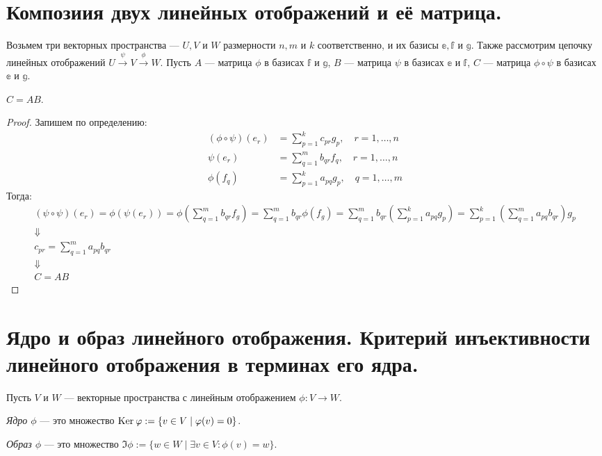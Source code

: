 \section{Композиия двух линейных отображений и её матрица.}

Возьмем три векторных пространства --- $U, V$ и $W$ размерности $n, m$ и $k$ соответственно, и их базисы $\mathbb{e}, \mathbb{f}$ и $\mathbb{g}$. Также рассмотрим цепочку линейных отображений $U \xrightarrow{\psi} V \xrightarrow{\phi} W$. Пусть $A$ --- матрица $\phi$ в базисах $\mathbb{f}$ и $\mathbb{g}$, $B$ --- матрица $\psi$ в базисах $\mathbb{e}$ и $\mathbb{f}$, $C$ --- матрица $\phi\circ\psi$ в базисах $\mathbb{e}$ и $\mathbb{g}$.

\begin{Suggestion}
$C = AB$.
\end{Suggestion}
\begin{proof} Запишем по определению:
\begin{align*}
(\phi \circ \psi)(e_r) &= \sum_{p = 1}^{k}c_{pr}g_p, \quad r = 1, \ldots, n \\
\psi(e_r) &= \sum_{q = 1}^{m}b_{qr}f_q, \quad r = 1, \ldots, n \\
\phi(f_q) &= \sum_{p = 1}^{k}a_{pq}g_p, \quad q = 1, \ldots, m
\end{align*}
Тогда:
\begin{gather*}
(\psi\circ\psi)(e_r) = \phi(\psi(e_r)) = \phi\left(\sum_{q = 1}^{m}b_{qr}f_g \right) = \sum_{q = 1}^{m}b_{qr}\phi(f_g) = \sum_{q = 1}^{m}b_{qr}\left(\sum_{p = 1}^{k}a_{pq}g_p \right) = \sum_{p = 1}^{k}\left(\sum_{q = 1}^{m}a_{pq}b_{qr} \right)g_p \\
\Downarrow \\
c_{pr} = \sum_{q = 1}^{m}a_{pq}b_{qr} \\
\Downarrow\\
 C = AB
\end{gather*}
\end{proof}

\section{Ядро и образ линейного отображения. Критерий инъективности линейного отображения в терминах его ядра.}

Пусть $V$ и $W$ --- векторные пространства с линейным отображением $\phi: V \rightarrow W$.

\begin{Def}
\textit{Ядро $\phi$} --- это множество $\mathrm{Ker}\:\varphi := \{v \in V \mid \varphi(v) = 0 \}$.
\end{Def} 
\begin{Def}
\textit{Образ $\phi$} --- это множество $\Im \phi := \{w \in W \mid \exists v \in V : \phi(v) = w \}$.
\end{Def}

